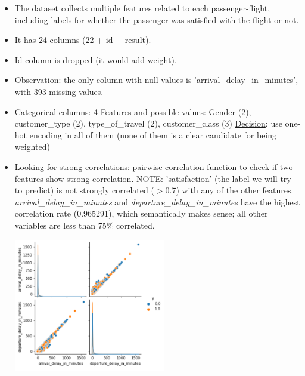 \begin{itemize}
	\item The dataset collects multiple features related to each passenger-flight, including labels for whether the passenger was satisfied with the flight or not.
	\item It has 24 columns (22 + id + result).
	\item Id column is dropped (it would add weight).
	\item Observation: the only column with null values is 'arrival\_delay\_in\_minutes', with 393 missing values.
	\item Categorical columns: 4
	\subitem \underline{Features and possible values}: Gender (2), customer\_type (2), type\_of\_travel (2), customer\_class (3)
	\subitem \underline{Decision}: use one-hot encoding in all of them (none of them is a clear candidate for being weighted)
	\item Looking for strong correlations: pairwise correlation function to check if two features show strong correlation.
	\subitem NOTE: 'satisfaction' (the label we will try to predict) is not strongly correlated ($>$0.7) with any of the other features. 
	\subitem \emph{arrival\_delay\_in\_minutes} and \emph{departure\_delay\_in\_minutes} have the highest correlation rate (0.965291), which semantically makes sense; all other variables are less than 75\% correlated.
	\subitem \begin{center}
		\captionsetup{type=figure}
		\includegraphics[width=250px]{correlation.png}
	\end{center}
\end{itemize}